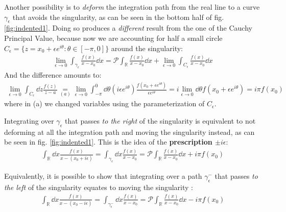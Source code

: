 \documentclass[../template.tex]{subfiles}
\begin{document}
Another possibility is to \textit{deform} the integration path from the real line to a curve $\gamma_{\epsilon}$ that avoids the singularity, as can be seen in the bottom half of fig. \ref{fig:indented1}. Doing so produces a \textit{different} result from the one of the Cauchy Principal Value, because now we are accounting for half a small circle $C_\epsilon = \{z = x_0 + \epsilon e^{i \theta} \colon \theta \in [-\pi, 0]\}$ around the singularity:
\begin{align} \label{eqn:diff}
    \lim_{\epsilon \to 0} \int_{\gamma_\epsilon} \frac{f(x)}{x-x_0} \dd{x} = \mathcal{P}\int_{\mathbb{R}} \frac{f(x)}{x-x_0} \dd{x} + 
    \lim_{\epsilon \to 0} \int_{C_{\epsilon}} \frac{f(x)}{x-x_0} \dd{x} 
\end{align} 
And the difference amounts to:
\begin{align*}
    \lim_{\epsilon \to 0} \int_{C_\epsilon} \dd{z} \frac{f(z)}{z-a} \underset{(a)}{=}  \lim_{\epsilon \to 0} \int_{-\pi}^0 \dd{\theta} (i \epsilon e^{i \theta}) \frac{f(x_0 + \epsilon e^{i \theta})}{\epsilon e^{i \theta}}  = i \lim_{\epsilon \to 0} \dd{\theta} f(x_0 + \epsilon e^{i \theta}) = i \pi f(x_0)
\end{align*}
where in (a) we changed variables using the parameterization of $C_\epsilon$.

\medskip

Integrating over $\gamma_\epsilon$ that passes \textit{to the right} of the singularity is equivalent to not deforming at all the integration path and moving the singularity  instead, as can be seen in fig. \ref{fig:indented1}. This is the idea of the \textbf{prescription $\pm i \epsilon$}:
\begin{align*}
    \int_\mathbb{R} \dd{x} \frac{f(x)}{x-(x_0 + i \epsilon)} = \int_{\gamma_\epsilon} \dd{x} \frac{f(x)}{x-x_0} =  \mathcal{P}\int_{\mathbb{R}} \frac{f(x)}{x-x_0} \dd{x} + i \pi f(x_0)
\end{align*}  

Equivalently, it is possible to show that integrating over a path $\gamma_{\epsilon}^-$ that passes \textit{to the left} of the singularity equates to moving the singularity :
\begin{align*}
    \int_{\mathbb{R}} \dd{x} \frac{f(x)}{x-(x_0 - i \epsilon)} = \int_{\gamma_{\epsilon}^-} \dd{x} \frac{f(x)}{x- x_0} =  \mathcal{P}\int_{\mathbb{R}} \frac{f(x)}{x-x_0} \dd{x} - i \pi f(x_0)
\end{align*} 
\end{document}
